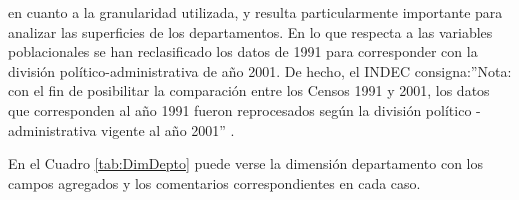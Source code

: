 \documentclass{article}
\theoremstyle{mytheoremstyle}
\theoremstyle{mytheoremstyle}
\theoremstyle{myproblemstyle}
\begin{document}
  en cuanto a la granularidad utilizada, y resulta particularmente importante para analizar las superficies de los departamentos.\newline\newline
  En lo que respecta a las variables poblacionales se han reclasificado los datos de 1991 para corresponder con la
  división político-administrativa de año 2001. De hecho, el INDEC consigna:''Nota: con el fin de posibilitar la comparación entre los Censos 1991 y 2001, los datos que 
 corresponden al año 1991 fueron reprocesados según la división político - administrativa vigente al año 2001'' .\newline
 
 En el Cuadro \ref{tab:DimDepto} puede verse la dimensión departamento con los campos agregados y los comentarios correspondientes en cada caso.
\end{document}
